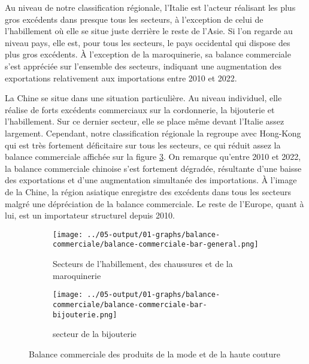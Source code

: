 \documentclass[french,10pt,a4paper]{article}
\begin{document}
Au niveau de notre classification régionale, l'Italie est l'acteur réalisant les plus gros excédents dans presque tous les secteurs, à l'exception de celui de l'habillement où elle se situe juste derrière le reste de l'Asie. Si l'on regarde au niveau pays, elle est, pour tous les secteurs, le pays occidental qui dispose des plus gros excédents. À l'exception de la maroquinerie, sa balance commerciale s'est appréciée sur l'ensemble des secteurs, indiquant une augmentation des exportations relativement aux importations entre 2010 et 2022.

La Chine se situe dans une situation particulière. Au niveau individuel, elle réalise de forts excédents commerciaux sur la cordonnerie, la bijouterie et l'habillement. Sur ce dernier secteur, elle se place même devant l'Italie assez largement. Cependant, notre classification régionale la regroupe avec Hong-Kong qui est très fortement déficitaire sur tous les secteurs, ce qui réduit assez la balance commerciale affichée sur la figure \ref{fig:balance-commerciale}. On remarque qu'entre 2010 et 2022, la balance commerciale chinoise s'est fortement dégradée, résultante d'une baisse des exportations et d'une augmentation simultanée des importations. À l'image de la Chine, la région asiatique enregistre des excédents dans tous les secteurs malgré une dépréciation de la balance commerciale. Le reste de l'Europe, quant à lui, est un importateur structurel depuis 2010. 

\begin{figure}[!h]
  \centering
  \begin{subfigure}{\textwidth}
    \centering    
    \texttt{[image: ../05-output/01-graphs/balance-commerciale/balance-commerciale-bar-general.png]}
    \caption{Secteurs de l'habillement, des chaussures et de la maroquinerie}
    \label{fig:balance-commerciale-bar-general}
  \end{subfigure}
  \vspace{0.5cm}
  \begin{subfigure}{\textwidth}
    \centering \texttt{[image: ../05-output/01-graphs/balance-commerciale/balance-commerciale-bar-bijouterie.png]}
 \caption{secteur de la bijouterie}
 \label{fig:balance-commerciale-bar-bijouterie}
  \end{subfigure}
  \caption{Balance commerciale des produits de la mode et de la haute couture}
  \label{fig:balance-commerciale}
\end{figure}
\end{document}

